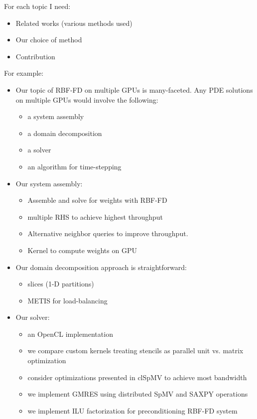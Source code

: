 \documentclass[11pt]{report}
\begin{document}
For each topic I need: 
\begin{itemize} 
\item Related works (various methods used)
\item Our choice of method
\item Contribution
\end{itemize}


For example: 
\begin{itemize} 
\item Our topic of RBF-FD on multiple GPUs is many-faceted. Any PDE solutions on multiple GPUs would involve the following: 
\begin{itemize} 
\item a system assembly
\item a domain decomposition
\item a solver
\item an algorithm for time-stepping
\end{itemize}

\item Our system assembly: 
\begin{itemize} 
\item Assemble and solve for weights with RBF-FD
\item multiple RHS to achieve highest throughput
\item Alternative neighbor queries to improve throughput. 
\item Kernel to compute weights on GPU
\end{itemize}


\item Our domain decomposition approach is straightforward:
\begin{itemize} 
\item slices (1-D partitions)
\item METIS for load-balancing
\end{itemize}


\item Our solver:
\begin{itemize} 
\item an OpenCL implementation
\item we compare custom kernels treating stencils as parallel unit vs. matrix optimization
\item consider optimizations presented in clSpMV to achieve most bandwidth
\item we implement GMRES using distributed SpMV and SAXPY operations
\item we implement ILU factorization for preconditioning RBF-FD system
\end{itemize}



\end{itemize}
\end{document}
